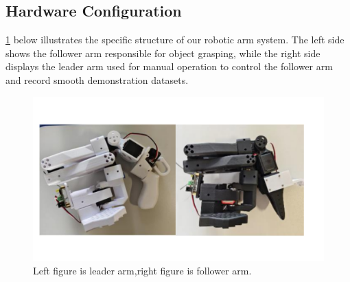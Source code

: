 \documentclass[runningheads]{llncs}
\begin{document}
\subsection{Hardware Configuration}
\cref{fig2-1} below illustrates the specific structure of our robotic arm system. The left side shows the follower arm responsible for object grasping, while the right side displays the leader arm used for manual operation to control the follower arm and record smooth demonstration datasets.


\begin{figure}
\centering
\includegraphics[width=\textwidth]{fig3.pdf}
\caption{Left figure is leader arm,right figure is follower arm.} \label{fig2-1}
\end{figure}

\end{document}
